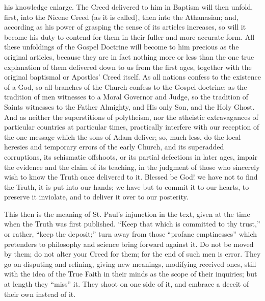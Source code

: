 his knowledge enlarge. The Creed delivered to him in Baptism will then
unfold, first, into the Nicene Creed (as it is called), then into the
Athanasian; and, according as his power of grasping the sense of its
articles increases, so will it become his duty to contend for them in
their fuller and more accurate form. All these unfoldings of the Gospel
Doctrine will become to him precious as the original articles, because
they are in fact nothing more or less than the one true explanation of
them delivered down to us from the first ages, together with the
original baptismal or Apostles' Creed itself. As all nations confess to
the existence of a God, so all branches of the Church confess to the
Gospel doctrine; as the tradition of men witnesses to a Moral Governor
and Judge, so the tradition of Saints witnesses to the Father Almighty,
and His only Son, and the Holy Ghost. And as neither the superstitions
of polytheism, nor the atheistic extravagances of particular countries
at particular times, practically interfere with our reception of the one
message which the sons of Adam deliver; so, much less, do the local
heresies and temporary errors of the early Church, and its superadded
corruptions, its schismatic offshoots, or its partial defections in
later ages, impair the evidence and the claim of its teaching, in the
judgment of those who sincerely wish to know the Truth once delivered to
it. Blessed be God! we have not to find the Truth, it is put into our
hands; we have but to commit it to our hearts, to preserve it inviolate,
and to deliver it over to our posterity.

This then is the meaning of St. Paul's injunction in the text, given
at the time when the Truth was first published. ``Keep that which is
committed to thy trust,'' or rather, ``keep the deposit;''
turn away from those ``profane emptinesses'' which pretenders to
philosophy and science bring forward against it. Do not be moved by
them; do not alter your Creed for them; for the end of such men is
error. They go on disputing and refining, giving new meanings, modifying
received ones, still with the idea of the True Faith in their minds
as
the scope of their inquiries; but at length they ``miss'' it.
They shoot on one side of it, and embrace a deceit of their own instead
of it.

